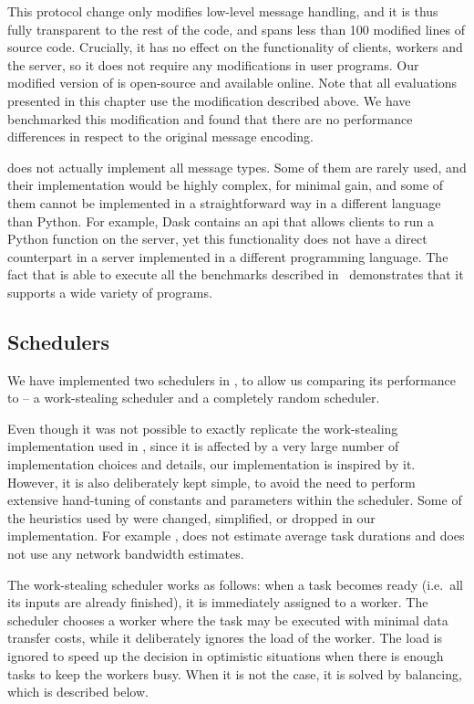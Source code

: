 This protocol change only modifies low-level message handling, and it is thus fully transparent to
the rest of the code, and spans less than 100 modified lines of \dask{} source
code. Crucially, it has no effect on the functionality of clients, workers and the server, so it
does not require any modifications in \dask{} user programs. Our modified
version of \dask{} is open-source and available
online. Note that all evaluations presented in this chapter use the
modification described above. We have benchmarked this modification and found that there are no
performance differences in respect to the original \dask{} message encoding.

\rsds{} does not actually implement all \dask{} message
types. Some of them are rarely used, and their implementation would be highly complex, for minimal
gain, and some of them cannot be implemented in a straightforward way in a different language than
Python. For example, Dask contains an \gls{api} that allows clients to run a
Python function on the server, yet this functionality does not have a direct counterpart in a
server implemented in a different programming language. The fact that \rsds{}
is able to execute all the benchmarks described in~ demonstrates that it
supports a wide variety of \dask{} programs.

\subsection*{Schedulers}
We have implemented two schedulers in \rsds{}, to allow us comparing its
performance to \dask{} -- a work-stealing scheduler and a completely random
scheduler.

Even though it was not possible to exactly replicate the work-stealing implementation used in
\dask{}, since it is affected by a very large number of implementation choices
and details, our implementation is inspired by it. However, it is also deliberately kept simple, to
avoid the need to perform extensive hand-tuning of constants and parameters within the scheduler.
Some of the heuristics used by \dask{} were changed, simplified, or dropped in
our implementation. For example \rsds{}, does not estimate average task
durations and does not use any network bandwidth estimates.

The \rsds{} work-stealing scheduler works as follows: when a task becomes ready
(i.e.\ all its inputs are already finished), it is immediately assigned to a worker. The scheduler
chooses a worker where the task may be executed with minimal data transfer costs, while it
deliberately ignores the load of the worker. The load is ignored to speed up the decision in
optimistic situations when there is enough tasks to keep the workers busy. When it is not the case,
it is solved by balancing, which is described below.

